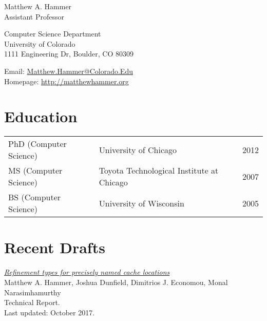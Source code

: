 \documentclass[10pt,letterpaper]{article}
\def\name{Matthew A. Hammer}
\renewenvironment{itemize}{
  \begin{list}{}{
    \setlength{\leftmargin}{1.5em}
    \setlength{\itemsep}{0.25em}
    \setlength{\parskip}{0pt}
    \setlength{\parsep}{0.25em}
  }
}{
  \end{list}
}
\begin{document}
{{\huge \name}
\\
Assistant Professor
}


\bigskip

\begin{minipage}[t]{0.495\textwidth}
Computer Science Department\\
University of Colorado\\
1111 Engineering Dr, Boulder, CO 80309
\end{minipage}
\begin{minipage}[t]{0.495\textwidth}
  Email: \href{mailto:matthew.hammer@colorado.edu}{Matthew.Hammer@Colorado.Edu} \\
  Homepage: \href{http://matthewhammer.org}{http://matthewhammer.org}
\end{minipage}

\section*{Education}

\begin{tabular}[t]{@{}l l l@{}}
PhD (Computer Science) & University of Chicago & 2012 \\
MS  (Computer Science) & Toyota Technological Institute at Chicago & 2007 \\
BS  (Computer Science) & University of Wisconsin & 2005 \\
\end{tabular}




\section*{Recent Drafts}

\begin{itemize}

\item
\href{https://arxiv.org/abs/1703.05410}
{\textit{Refinement types for precisely named cache locations}}
\\
Matthew A. Hammer, Joshua Dunfield, Dimitrios J. Economou, Monal Narasimhamurthy
\\
Technical Report.
\\
Last updated: October 2017.

\end{itemize}
\end{document}
